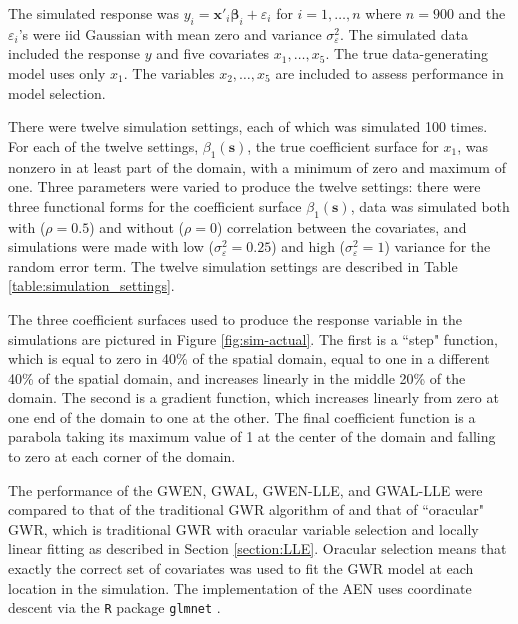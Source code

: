 \documentclass[authoryear, review, 11pt]{elsarticle}
\begin{document}
	The simulated response was $y_i = \bm{x}'_i \bm{\beta}_i + \varepsilon_i$ for $i=1, \dots, n$ where $n=900$ and the $\varepsilon_i$'s were iid Gaussian with mean zero and variance $\sigma_\varepsilon^2$. The simulated data included the response $y$ and five covariates $x_1, \dots, x_5$. The true data-generating model uses only $x_1$. The variables $x_2, \dots, x_5$ are included to assess performance in model selection.
	
	There were twelve simulation settings, each of which was simulated 100 times. For each of the twelve settings, $\beta_1(\bm{s})$, the true coefficient surface for $x_1$, was nonzero in at least part of the domain, with a minimum of zero and maximum of one. Three parameters were varied to produce the twelve settings: there were three functional forms for the coefficient surface $\beta_1(\bm{s})$, data was simulated both with ($\rho = 0.5$) and without ($\rho = 0$) correlation between the covariates, and simulations were made with low ($\sigma_\varepsilon^2 = 0.25$) and high ($\sigma_\varepsilon^2 = 1$) variance for the random error term. The twelve simulation settings are described in Table \ref{table:simulation_settings}.
	
	The three coefficient surfaces used to produce the response variable in the simulations are pictured in Figure \ref{fig:sim-actual}. The first is a ``step" function, which is equal to zero in 40\% of the spatial domain, equal to one in a different 40\% of the spatial domain, and increases linearly in the middle 20\% of the domain. The second is a gradient function, which increases linearly from zero at one end of the domain to one at the other. The final coefficient function is a parabola taking its maximum value of 1 at the center of the domain and falling to zero at each corner of the domain.
	
	The performance of the GWEN, GWAL, GWEN-LLE, and GWAL-LLE were compared to that of the traditional GWR algorithm of \cite{Fotheringham:2002} and that of ``oracular" GWR, which is traditional GWR with oracular variable selection and locally linear fitting as described in Section \ref{section:LLE}. Oracular selection means that exactly the correct set of covariates was used to fit the GWR model at each location in the simulation. The implementation of the AEN uses coordinate descent via the {\tt R} package {\tt glmnet} \citep{Friedman:2010}.
\end{document}

